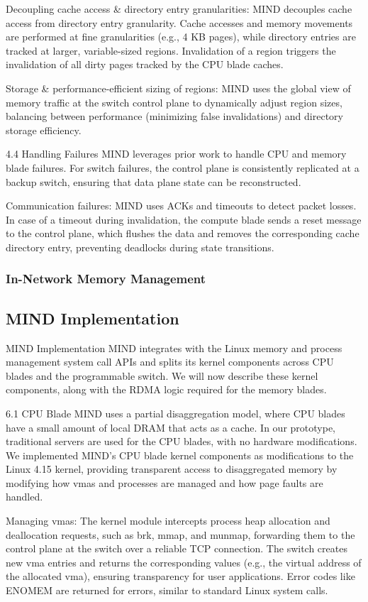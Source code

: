 Decoupling cache access \& directory entry granularities: MIND decouples cache access from directory entry granularity. Cache accesses and memory movements are performed at fine granularities (e.g., 4 KB pages), while directory entries are tracked at larger, variable-sized regions. Invalidation of a region triggers the invalidation of all dirty pages tracked by the CPU blade caches.

Storage \& performance-efficient sizing of regions: MIND uses the global view of memory traffic at the switch control plane to dynamically adjust region sizes, balancing between performance (minimizing false invalidations) and directory storage efficiency.

4.4 Handling Failures
MIND leverages prior work to handle CPU and memory blade failures. For switch failures, the control plane is consistently replicated at a backup switch, ensuring that data plane state can be reconstructed.

Communication failures: MIND uses ACKs and timeouts to detect packet losses. In case of a timeout during invalidation, the compute blade sends a reset message to the control plane, which flushes the data and removes the corresponding cache directory entry, preventing deadlocks during state transitions.

\subsubsection{In-Network Memory Management}

\subsection{MIND Implementation}
MIND Implementation
MIND integrates with the Linux memory and process management system call APIs and splits its kernel components across CPU blades and the programmable switch. We will now describe these kernel components, along with the RDMA logic required for the memory blades.

6.1 CPU Blade
MIND uses a partial disaggregation model, where CPU blades have a small amount of local DRAM that acts as a cache. In our prototype, traditional servers are used for the CPU blades, with no hardware modifications. We implemented MIND’s CPU blade kernel components as modifications to the Linux 4.15 kernel, providing transparent access to disaggregated memory by modifying how vmas and processes are managed and how page faults are handled.

Managing vmas: The kernel module intercepts process heap allocation and deallocation requests, such as brk, mmap, and munmap, forwarding them to the control plane at the switch over a reliable TCP connection. The switch creates new vma entries and returns the corresponding values (e.g., the virtual address of the allocated vma), ensuring transparency for user applications. Error codes like ENOMEM are returned for errors, similar to standard Linux system calls.

